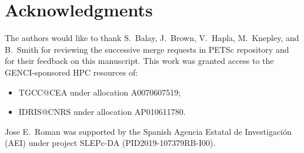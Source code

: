 \documentclass[3p,11pt]{elsarticle}
\begin{document}
\section*{Acknowledgments}
The authors would like to thank S.~Balay, J.~Brown, V.~Hapla, M.~Knepley, and
B.~Smith for reviewing the successive merge requests in PETSc repository and
for their feedback on this manuscript. This work was granted access to the
GENCI-sponsored HPC resources of:
\begin{itemize}
    \item TGCC@CEA under allocation A0070607519;
    \item IDRIS@CNRS under allocation AP010611780.
\end{itemize}
Jose E.~Roman was supported by the Spanish Agencia Estatal de Investigaci\'{o}n (AEI) under project SLEPc-DA (PID2019-107379RB-I00).
\end{document}
